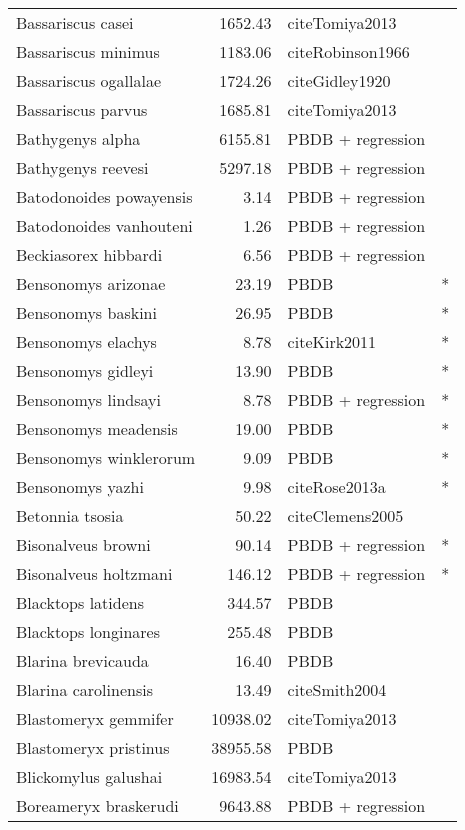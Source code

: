 \begin{table}[ht]
\begin{tabular}{lrll}
  Bassariscus casei & 1652.43 & cite{Tomiya2013} &  \\ 
  Bassariscus minimus & 1183.06 & cite{Robinson1966} &  \\ 
  Bassariscus ogallalae & 1724.26 & cite{Gidley1920} &  \\ 
  Bassariscus parvus & 1685.81 & cite{Tomiya2013} &  \\ 
  Bathygenys alpha & 6155.81 & PBDB + regression &  \\ 
  Bathygenys reevesi & 5297.18 & PBDB + regression &  \\ 
  Batodonoides powayensis & 3.14 & PBDB + regression &  \\ 
  Batodonoides vanhouteni & 1.26 & PBDB + regression &  \\ 
  Beckiasorex hibbardi & 6.56 & PBDB + regression &  \\ 
  Bensonomys arizonae & 23.19 & PBDB & * \\ 
  Bensonomys baskini & 26.95 & PBDB & * \\ 
  Bensonomys elachys & 8.78 & cite{Kirk2011} & * \\ 
  Bensonomys gidleyi & 13.90 & PBDB & * \\ 
  Bensonomys lindsayi & 8.78 & PBDB + regression & * \\ 
  Bensonomys meadensis & 19.00 & PBDB & * \\ 
  Bensonomys winklerorum & 9.09 & PBDB & * \\ 
  Bensonomys yazhi & 9.98 & cite{Rose2013a} & * \\ 
  Betonnia tsosia & 50.22 & cite{Clemens2005} &  \\ 
  Bisonalveus browni & 90.14 & PBDB + regression & * \\ 
  Bisonalveus holtzmani & 146.12 & PBDB + regression & * \\ 
  Blacktops latidens & 344.57 & PBDB &  \\ 
  Blacktops longinares & 255.48 & PBDB &  \\ 
  Blarina brevicauda & 16.40 & PBDB &  \\ 
  Blarina carolinensis & 13.49 & cite{Smith2004} &  \\ 
  Blastomeryx gemmifer & 10938.02 & cite{Tomiya2013} &  \\ 
  Blastomeryx pristinus & 38955.58 & PBDB &  \\ 
  Blickomylus galushai & 16983.54 & cite{Tomiya2013} &  \\ 
  Boreameryx braskerudi & 9643.88 & PBDB + regression &  \\ 

\end{tabular}
\end{table}

